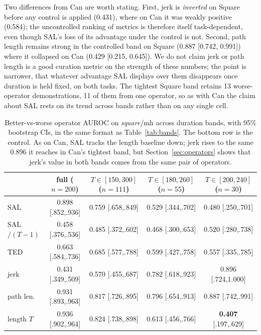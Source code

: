 \documentclass[10pt]{article}
\begin{document}
Two differences from Can are worth stating. First, jerk is \emph{inverted}
on Square before any control is applied (0.431), where on Can it was weakly
positive (0.584); the uncontrolled ranking of metrics is therefore itself
task-dependent, even though SAL's loss of its advantage under the control
is not. Second, path
length remains strong in the controlled band on Square (0.887 [0.742,
0.991]) where it collapsed on Can (0.429 [0.215, 0.645]). We do not claim
jerk or path length is a good curation metric on the strength of these
numbers; the point is narrower, that whatever advantage SAL displays over
them disappears once duration is held fixed, on both tasks. The tightest
Square band retains 13 worse-operator demonstrations, 11 of them from one
operator, so as with Can the claim about SAL rests on its trend across
bands rather than on any single cell.

\begin{table}[t]
\centering
\small
\begin{tabular}{lcccc}
\toprule
& full ($n{=}200$) & $T \in [150,300]$ ($n{=}111$) & $T \in [180,260]$ ($n{=}55$) & $T \in [200,240]$ ($n{=}30$) \\
\midrule
SAL       & 0.898 [.852,.936] & 0.759 [.658,.849] & 0.529 [.344,.702] & 0.480 [.250,.701] \\
SAL$/(T{-}1)$ & 0.458 [.376,.536] & 0.485 [.372,.602] & 0.468 [.300,.653] & 0.520 [.280,.738] \\
TED       & 0.663 [.584,.736] & 0.685 [.577,.788] & 0.599 [.427,.758] & 0.557 [.335,.785] \\
jerk      & 0.431 [.349,.509] & 0.570 [.455,.687] & 0.782 [.618,.923] & 0.896 [.724,1.000] \\
path len. & 0.931 [.893,.963] & 0.817 [.726,.895] & 0.796 [.654,.913] & 0.887 [.742,.991] \\
\midrule
length $T$ & 0.936 [.902,.964] & 0.824 [.738,.898] & 0.613 [.456,.766] & \textbf{0.407} [.197,.629] \\
\bottomrule
\end{tabular}
\caption{Better-vs-worse operator AUROC on \emph{square}/mh across duration
bands, with 95\% bootstrap CIs, in the same format as
Table~\ref{tab:bands}. The bottom row is the control. As on Can, SAL
tracks the length baseline down; jerk rises to the same 0.896 it reaches in
Can's tightest band, but Section~\ref{sec:operators} shows that jerk's value
in both bands comes from the same pair of operators.}
\label{tab:square}
\end{table}
\end{document}
